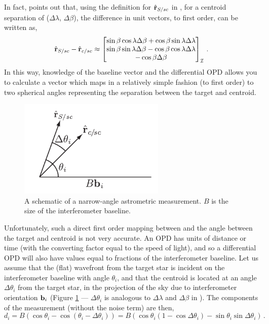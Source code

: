 In fact, \citet{colavita1994measurement} points out that, using the definition for $\hat{\mathbf r}_{S/sc}$ in , for a centroid separation of ($\Delta \lambda$, $\Delta \beta$), the difference in unit vectors, to first order, can be written as,
\begin{equation}\label{eq:sdiff_fo}
\hat{\mathbf r}_{S/sc} - \hat{\mathbf r}_{c/sc} \approx \left[\begin{matrix} 
\sin\beta\cos\lambda\Delta\beta + \cos\beta\sin\lambda\Delta\lambda\\
\sin\beta\sin\lambda\Delta\beta - \cos\beta\cos\lambda\Delta\lambda\\
-\cos\beta\Delta\beta \end{matrix}\right]_\mathcal{I} \, .
\end{equation}
In this way, knowledge of the baseline vector and the differential OPD allows you to calculate a vector which maps in a relatively simple fashion (to first order) to two spherical angles representing the separation between the target and centroid.

\begin{figure}[ht]
\centering
\includegraphics[width=2.75in]{./figures/narrow_angle_model}
 \caption[Narrow angle astrometry schematic]{ A schematic of a narrow-angle astrometric measurement.  $B$ is the size of the interferometer baseline.}
\label{fig:narrow_mode_model} 
\end{figure} 

Unfortunately, such a direct first order mapping between  and the angle between the target and centroid is not very accurate.  An OPD has units of distance or time (with the converting factor equal to the speed of light), and so a differential OPD will also have values equal to fractions of the interferometer baseline.  Let us assume that the (flat) wavefront from the target star is incident on the interferometer baseline with angle $\theta_i$, and that the centroid is located at an angle $\Delta\theta_i$ from the target star, in the projection of the sky due to interferometer orientation $\mathbf b_i$ (Figure \ref{fig:narrow_mode_model} --- $\Delta\theta_i$ is analogous to $\Delta\lambda$ and $\Delta\beta$ in ).
The components of the measurement (without the noise term) are then,
\begin{equation}
d_i =B \left(\cos\theta_i - \cos(\theta_i - \Delta\theta_i)\right) =B\left(\cos\theta_i(1 - \cos\Delta\theta_i) - \sin\theta_i \sin\Delta\theta_i\right) \,.
\end{equation}

